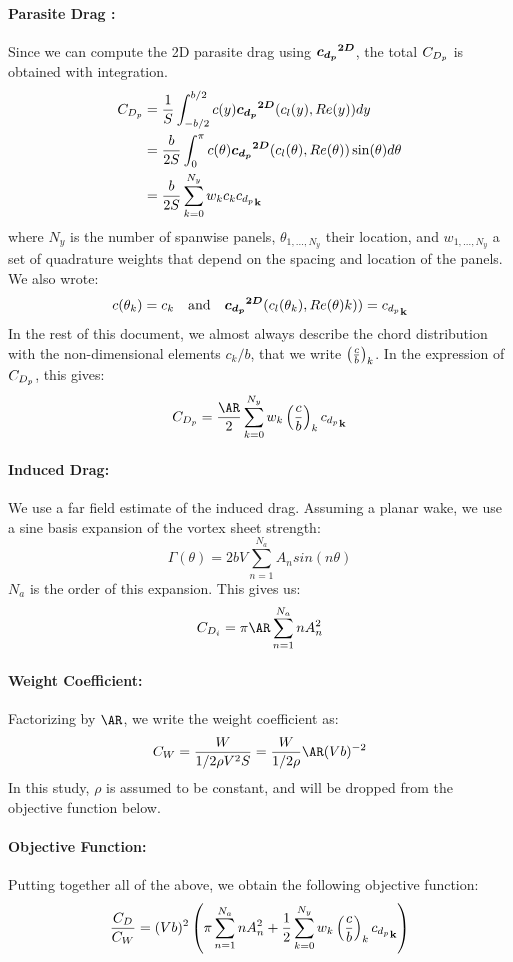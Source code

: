 \documentclass[letterpaper,12pt]{article}
\begin{document}
\paragraph{Parasite Drag :}Since we can compute the 2D parasite drag using $\boldsymbol{{c_{d_p}}^{2D}}$, the total $C_{D_p}$ is obtained with integration.
\begin{align*}
	C_{D_p} &= \frac 1 S \int_{-b/2}^{b/2} c(y) \boldsymbol{{c_{d_p}}^{2D}}(c_l(y), Re(y)) dy\\
	&= \frac b {2S} \int_{0}^{\pi} c(\theta) \boldsymbol{{c_{d_p}}^{2D}}(c_l(\theta), Re(\theta)) \sin(\theta) d\theta\\
	&= \frac b {2S} \sum_{k=0}^{N_y} w_k c_k {c_{d_p}}_{\bf k}
\end{align*}
where $N_y$ is the number of spanwise panels, $\theta_{1,\dots, N_y}$ their location, 
and $w_{1,\dots, N_y}$ a set of quadrature weights that depend on the spacing and location of the panels. We also wrote:
$$c(\theta_k) = c_k \quad \text{and} \quad \boldsymbol{{c_{d_p}}^{2D}}(c_l(\theta_k), Re(\theta)k)) = {c_{d_p}}_{\bf k}$$
In the rest of this document, we almost always describe the chord distribution with the non-dimensional elements $c_k/b$, that we write $\left( \frac c b \right)_{k}$. In the expression of $C_{D_p}$, this gives:
$$\CDp = \frac {\AR} {2} \sum_{k=0}^{N_y} w_k \cb{k} \cdp{k}$$

\paragraph{Induced Drag:}We use a far field estimate of the induced drag. 
Assuming a planar wake, we use a sine basis expansion of the vortex sheet strength:
$$\Gamma(\theta) = 2bV \sum_{n=1}^{N_a} A_n sin(n \theta)$$
$N_a$ is the order of this expansion.
This gives us:
$$\CDi = \pi \AR \sum_{n=1}^{N_a} n A_n^2$$

\paragraph{Weight Coefficient:}Factorizing by $\AR$, we write the weight coefficient as: 
$$C_W = \frac{W}{1/2 \rho V^2 S} = \frac{W}{1/2 \rho }\AR (Vb)^{-2} $$
In this study, $\rho$ is assumed to be constant, and will be dropped from the objective function below.

\paragraph{Objective Function:}Putting together all of the above, we obtain the following objective function:
$$\frac{C_D}{C_W} = (Vb)^2\left( \pi \sum_{n=1}^{N_a} n A_n^2 +   \frac {1} {2} \sum_{k=0}^{N_y} w_k \left( \frac c b \right)_{k} {c_{d_p}}_{\bf k} \right)$$
\end{document}
